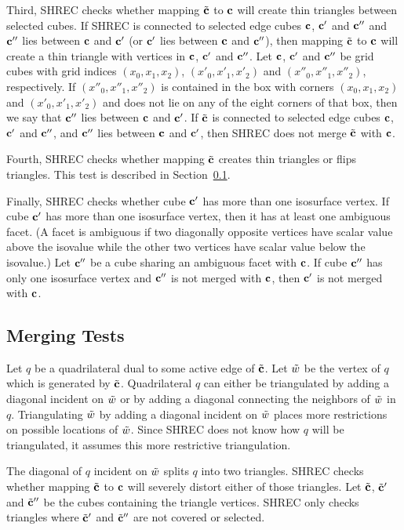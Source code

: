 Third, SHREC checks whether mapping ${\tilde{\mathbf{c}}}$ to $\mathbf{c}$
will create thin triangles between selected cubes.
If SHREC is connected to selected edge cubes $\mathbf{c}$, $\mathbf{c}'$ and $\mathbf{c}''$
and $\mathbf{c}''$ lies between $\mathbf{c}$ and $\mathbf{c}'$
(or $\mathbf{c}'$ lies between $\mathbf{c}$ and $\mathbf{c}''$),
then mapping ${\tilde{\mathbf{c}}}$ to $\mathbf{c}$ will create a thin triangle
with vertices in $\mathbf{c}$, $\mathbf{c}'$ and $\mathbf{c}''$.
Let $\mathbf{c}$, $\mathbf{c}'$ and $\mathbf{c}''$ be grid cubes with grid indices
$(x_0,x_1,x_2)$, $(x'_0,x'_1,x'_2)$ and $(x''_0,x''_1,x''_2)$, respectively.
If $(x''_0,x''_1,x''_2)$ is contained in the box with corners
$(x_0,x_1,x_2)$ and $(x'_0,x'_1,x'_2)$ and does not lie on any 
of the eight corners of that box,
then we say that $\mathbf{c}''$ lies between $\mathbf{c}$ and $\mathbf{c}'$.
If ${\tilde{\mathbf{c}}}$ is connected to selected edge cubes $\mathbf{c}$, $\mathbf{c}'$ and $\mathbf{c}''$,
and $\mathbf{c}''$ lies between $\mathbf{c}$ and $\mathbf{c}'$,
then SHREC does not merge ${\tilde{\mathbf{c}}}$ with $\mathbf{c}$.

Fourth, SHREC checks whether mapping ${\tilde{\mathbf{c}}}$ creates thin triangles
or flips triangles.
This test is described in Section~\ref{section:distortion_tests}.

Finally, SHREC checks whether cube $\mathbf{c}'$ has more than one isosurface vertex.
If cube $\mathbf{c}'$ has more than one isosurface vertex,
then it has at least one ambiguous facet.
(A facet is ambiguous if two diagonally opposite vertices have
scalar value above the isovalue while the other two vertices
have scalar value below the isovalue.)
Let $\mathbf{c}''$ be a cube sharing an ambiguous facet with $\mathbf{c}$.
If cube $\mathbf{c}''$ has only one isosurface vertex and 
$\mathbf{c}''$ is not merged with $\mathbf{c}$, then $\mathbf{c}'$ is not merged with $\mathbf{c}$.

\subsection{Merging Tests}
\label{section:distortion_tests}

Let $q$ be a quadrilateral dual to some active edge of ${\tilde{\mathbf{c}}}$.
Let $\tilde{w}$ be the vertex of $q$ which is generated by ${\tilde{\mathbf{c}}}$.
Quadrilateral $q$ can either be triangulated by adding a diagonal
incident on $\tilde{w}$ or by adding a diagonal connecting the neighbors
of $\tilde{w}$ in $q$.
Triangulating $\tilde{w}$ by adding a diagonal incident on $\tilde{w}$
places more restrictions on possible locations of $\tilde{w}$.
Since SHREC does not know how $q$ will be triangulated,
it assumes this more restrictive triangulation.

The diagonal of $q$ incident on $\tilde{w}$ splits $q$ into two triangles.
SHREC checks whether mapping ${\tilde{\mathbf{c}}}$ to $\mathbf{c}$ will severely distort
either of those triangles.
Let ${\tilde{\mathbf{c}}}$, ${\tilde{\mathbf{c}}}'$ and ${\tilde{\mathbf{c}}}''$ be the cubes 
containing the triangle vertices.
SHREC only checks triangles where ${\tilde{\mathbf{c}}}'$ and ${\tilde{\mathbf{c}}}''$ 
are not covered or selected.

